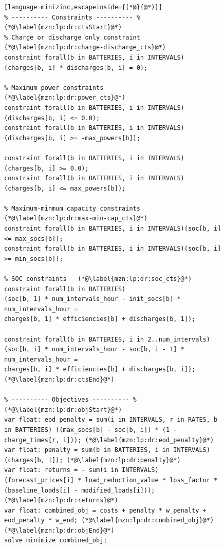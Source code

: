\begin{figure}[hp!]
\begin{lstlisting}[language=minizinc,escapeinside={(*@}{@*)}]
% ---------- Constraints ---------- %	(*@\label{mzn:lp:dr:ctsStart}@*)
% Charge or discharge only constraint   (*@\label{mzn:lp:dr:charge-discharge_cts}@*)
constraint forall(b in BATTERIES, i in INTERVALS)(charges[b, i] * discharges[b, i] = 0); 
		
% Maximum power constraints  (*@\label{mzn:lp:dr:power_cts}@*)
constraint forall(b in BATTERIES, i in INTERVALS)(discharges[b, i] <= 0.0);
constraint forall(b in BATTERIES, i in INTERVALS)(discharges[b, i] >= -max_powers[b]);
		
constraint forall(b in BATTERIES, i in INTERVALS)(charges[b, i] >= 0.0);
constraint forall(b in BATTERIES, i in INTERVALS)(charges[b, i] <= max_powers[b]);
		
% Maximum-minmum capacity constraints  (*@\label{mzn:lp:dr:max-min-cap_cts}@*)
constraint forall(b in BATTERIES, i in INTERVALS)(soc[b, i] <= max_socs[b]);
constraint forall(b in BATTERIES, i in INTERVALS)(soc[b, i] >= min_socs[b]);

% SOC constraints   (*@\label{mzn:lp:dr:soc_cts}@*)
constraint forall(b in BATTERIES) 
(soc[b, 1] * num_intervals_hour - init_socs[b] * num_intervals_hour = 
charges[b, 1] * efficiencies[b] + discharges[b, 1]);

constraint forall(b in BATTERIES, i in 2..num_intervals) 
(soc[b, i] * num_intervals_hour - soc[b, i - 1] * num_intervals_hour = 
charges[b, i] * efficiencies[b] + discharges[b, i]); (*@\label{mzn:lp:dr:ctsEnd}@*)

% ---------- Objectives ---------- % (*@\label{mzn:lp:dr:objStart}@*)
var float: eod_penalty = sum(i in INTERVALS, r in RATES, b in BATTERIES) ((max_socs[b] - soc[b, i]) * (1 - charge_times[r, i])); (*@\label{mzn:lp:dr:eod_penalty}@*)
var float: penalty = sum(b in BATTERIES, i in INTERVALS)(charges[b, i]); (*@\label{mzn:lp:dr:penalty}@*)
var float: returns = - sum(i in INTERVALS)
(forecast_prices[i] * load_reduction_value * loss_factor *
(baseline_loads[i] - modified_loads[i])); (*@\label{mzn:lp:dr:returns}@*)
var float: combined_obj = costs + penalty * w_penalty + eod_penalty * w_eod; (*@\label{mzn:lp:dr:combined_obj}@*) (*@\label{mzn:lp:dr:objEnd}@*)
solve minimize combined_obj;
\end{lstlisting}
\end{figure}

